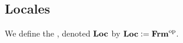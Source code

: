 \documentclass{book}
\begin{document}
	
	
	
	
	
	
	
	
	
	
	
	
	
	
	
	
	
	
	
	
	
	
	
	
	
	
	
	
	
	
	
	
	
	
	
	
	
	
	
	
	
	
	
	
	
	
	
	
	
	
	
	
	
	
	\subsection{Locales}
	
	\begin{defn}
		We define the , denoted $\operatorname*{\text{\textbf{Loc}}}$ by $\operatorname*{\text{\textbf{Loc}}} \vcentcolon= \mathcal{\operatorname*{\text{\textbf{Frm}}}}^{\text{op}}$.
	\end{defn}
	
	
	
	
	
	
	
	
	
	
	
	
	
	
	
	
	
	
	
	
	
	
	
	
	
	
	
	
	
	
	
	
	
	
	
	
	
	
	
	
	
	
	
	
	
\end{document}
